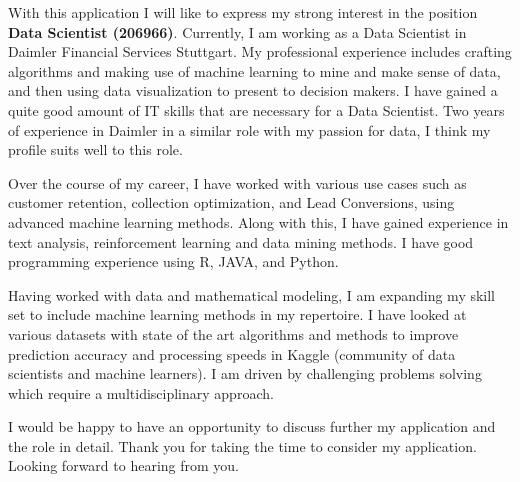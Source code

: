 \documentclass[20pt, a4paper]{awesome-cv}
\begin{document}
\makecvheader

\makelettertitle

\begin{cvletter}

With this application I will like to express my strong interest in the position \textbf{Data Scientist (206966)}. Currently, I am working as a Data Scientist in Daimler Financial Services Stuttgart. My professional experience includes crafting algorithms and making use of machine learning to mine and make sense of data, and then using data visualization to present to decision makers. I have gained a quite good amount of IT skills that are necessary for a Data Scientist. Two years of experience in Daimler in a similar role with my passion for data, I think my profile suits well to this role.

\par Over the course of my career, I have worked with various use cases such as customer retention, collection optimization, and Lead Conversions, using advanced machine learning methods. Along with this, I have gained experience in text analysis, reinforcement learning and data mining methods. I have good programming experience using R, JAVA, and Python.
\par Having worked with data and mathematical modeling, I am expanding my skill set to include machine learning methods in my repertoire. I have looked at various datasets with state of the art algorithms and methods to improve prediction accuracy and processing speeds in Kaggle (community of data scientists and machine learners).  I am driven by challenging problems solving which require a multidisciplinary approach.
\par I would be happy to have an opportunity to discuss further my application and the role in detail.  Thank you for taking the time to consider my application. Looking forward to hearing from you.
\end{cvletter}

\makeletterclosing
\end{document}
